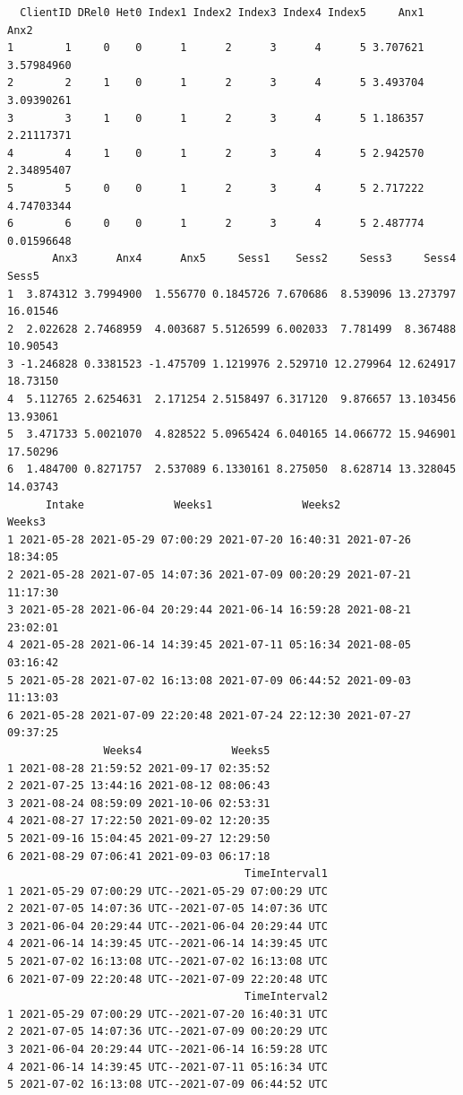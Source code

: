 \documentclass[
  english,
]{book}
\begin{document}
\begin{verbatim}
  ClientID DRel0 Het0 Index1 Index2 Index3 Index4 Index5     Anx1       Anx2
1        1     0    0      1      2      3      4      5 3.707621 3.57984960
2        2     1    0      1      2      3      4      5 3.493704 3.09390261
3        3     1    0      1      2      3      4      5 1.186357 2.21117371
4        4     1    0      1      2      3      4      5 2.942570 2.34895407
5        5     0    0      1      2      3      4      5 2.717222 4.74703344
6        6     0    0      1      2      3      4      5 2.487774 0.01596648
       Anx3      Anx4      Anx5     Sess1    Sess2     Sess3     Sess4    Sess5
1  3.874312 3.7994900  1.556770 0.1845726 7.670686  8.539096 13.273797 16.01546
2  2.022628 2.7468959  4.003687 5.5126599 6.002033  7.781499  8.367488 10.90543
3 -1.246828 0.3381523 -1.475709 1.1219976 2.529710 12.279964 12.624917 18.73150
4  5.112765 2.6254631  2.171254 2.5158497 6.317120  9.876657 13.103456 13.93061
5  3.471733 5.0021070  4.828522 5.0965424 6.040165 14.066772 15.946901 17.50296
6  1.484700 0.8271757  2.537089 6.1330161 8.275050  8.628714 13.328045 14.03743
      Intake              Weeks1              Weeks2              Weeks3
1 2021-05-28 2021-05-29 07:00:29 2021-07-20 16:40:31 2021-07-26 18:34:05
2 2021-05-28 2021-07-05 14:07:36 2021-07-09 00:20:29 2021-07-21 11:17:30
3 2021-05-28 2021-06-04 20:29:44 2021-06-14 16:59:28 2021-08-21 23:02:01
4 2021-05-28 2021-06-14 14:39:45 2021-07-11 05:16:34 2021-08-05 03:16:42
5 2021-05-28 2021-07-02 16:13:08 2021-07-09 06:44:52 2021-09-03 11:13:03
6 2021-05-28 2021-07-09 22:20:48 2021-07-24 22:12:30 2021-07-27 09:37:25
               Weeks4              Weeks5
1 2021-08-28 21:59:52 2021-09-17 02:35:52
2 2021-07-25 13:44:16 2021-08-12 08:06:43
3 2021-08-24 08:59:09 2021-10-06 02:53:31
4 2021-08-27 17:22:50 2021-09-02 12:20:35
5 2021-09-16 15:04:45 2021-09-27 12:29:50
6 2021-08-29 07:06:41 2021-09-03 06:17:18
                                     TimeInterval1
1 2021-05-29 07:00:29 UTC--2021-05-29 07:00:29 UTC
2 2021-07-05 14:07:36 UTC--2021-07-05 14:07:36 UTC
3 2021-06-04 20:29:44 UTC--2021-06-04 20:29:44 UTC
4 2021-06-14 14:39:45 UTC--2021-06-14 14:39:45 UTC
5 2021-07-02 16:13:08 UTC--2021-07-02 16:13:08 UTC
6 2021-07-09 22:20:48 UTC--2021-07-09 22:20:48 UTC
                                     TimeInterval2
1 2021-05-29 07:00:29 UTC--2021-07-20 16:40:31 UTC
2 2021-07-05 14:07:36 UTC--2021-07-09 00:20:29 UTC
3 2021-06-04 20:29:44 UTC--2021-06-14 16:59:28 UTC
4 2021-06-14 14:39:45 UTC--2021-07-11 05:16:34 UTC
5 2021-07-02 16:13:08 UTC--2021-07-09 06:44:52 UTC

\end{verbatim}
\end{document}
